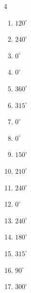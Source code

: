 \begin{multicols}{4}
\begin{enumerate}
  \item $\displaystyle 120^{\circ}$

  \item $\displaystyle 240^{\circ}$

  \item $\displaystyle 0^{\circ}$
        \phantom{$\displaystyle =0$}

  \item $\displaystyle 0^{\circ}$
        \phantom{$\displaystyle =0$}

  \item $\displaystyle 360^{\circ}$
        \phantom{$\displaystyle =2\pi$}

  \item $\displaystyle 315^{\circ}$

  \item $\displaystyle 0^{\circ}$
        \phantom{$\displaystyle =0$}

  \item $\displaystyle 0^{\circ}$
        \phantom{$\displaystyle =0$}

  \item $\displaystyle 150^{\circ}$

  \item $\displaystyle 210^{\circ}$

  \item $\displaystyle 240^{\circ}$

  \item $\displaystyle 0^{\circ}$
        \phantom{$\displaystyle =0$}

  \item $\displaystyle 240^{\circ}$

  \item $\displaystyle 180^{\circ}$
        \phantom{$\displaystyle =\pi$}

  \item $\displaystyle 315^{\circ}$

  \item $\displaystyle 90^{\circ}$

  \item $\displaystyle 300^{\circ}$


\end{enumerate}
\end{multicols}
